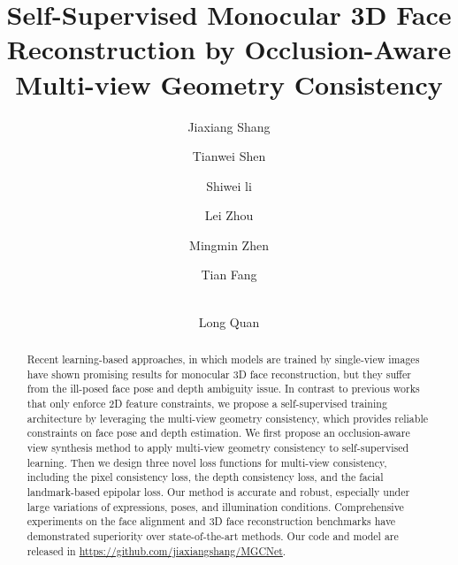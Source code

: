 \documentclass[runningheads]{llncs}
\begin{document}
\pagestyle{headings}
\mainmatter
\def\ECCVSubNumber{2293}  

\title{Self-Supervised Monocular 3D Face Reconstruction by Occlusion-Aware \\ Multi-view Geometry Consistency} 

\begin{comment}
\titlerunning{ECCV-20 submission ID \ECCVSubNumber} 
\authorrunning{ECCV-20 submission ID \ECCVSubNumber} 
\author{Anonymous ECCV submission}
\institute{Paper ID \ECCVSubNumber}
\end{comment}




\author{Jiaxiang Shang \and Tianwei Shen \and
		Shiwei li \and Lei Zhou \\ \and 
		Mingmin Zhen \and Tian Fang \and \\ 
		Long Quan}

\maketitle

\begin{abstract}
Recent learning-based approaches, in which models are trained by single-view images have shown promising results for monocular 3D face reconstruction, but they suffer from the ill-posed face pose and depth ambiguity issue. 
In contrast to previous works that only enforce 2D feature constraints, we propose a self-supervised training architecture by leveraging the multi-view geometry consistency, which provides reliable constraints on face pose and depth estimation. 
We first propose an occlusion-aware view synthesis method to apply multi-view geometry consistency to self-supervised learning. Then we design three novel loss functions for multi-view consistency, including the pixel consistency loss, the depth consistency loss, and the facial landmark-based epipolar loss.
Our method is accurate and robust, especially under large variations of expressions, poses, and illumination conditions. Comprehensive experiments on the face alignment and 3D face reconstruction benchmarks have demonstrated superiority over state-of-the-art methods. Our code and model are released in \url{https://github.com/jiaxiangshang/MGCNet}.
\end{abstract}
\end{document}
